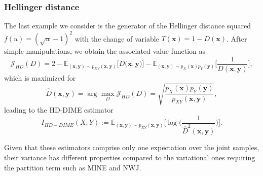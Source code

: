 \subsubsection{Hellinger distance}
The last example we consider is the generator of the Hellinger distance squared $f(u)=(\sqrt{u}-1)^2$ with the change of variable $T(\mathbf{x})=1-D(\mathbf{x})$. After simple manipulations, we obtain the associated value function as
\begin{equation}
\mathcal{J}_{HD}(D) = 2-\mathbb{E}_{(\mathbf{x},\mathbf{y}) \sim p_{XY}(\mathbf{x},\mathbf{y})}\biggl[D\bigl(\mathbf{x},\mathbf{y}\bigr)\biggr] -\mathbb{E}_{(\mathbf{x},\mathbf{y}) \sim p_{X}(\mathbf{x})p_{Y}(\mathbf{y})}\biggl[\frac{1}{D(\mathbf{x},\mathbf{y})}\biggr],
\end{equation}
which is maximized for
\begin{equation}
\label{eq:MI_optimal_ratio_HD}
\hat{D}(\mathbf{x},\mathbf{y}) =\arg \max_D \mathcal{J}_{HD}(D) = \sqrt{\frac{p_X(\mathbf{x})p_Y(\mathbf{y})}{p_{XY}(\mathbf{x},\mathbf{y})}},
\end{equation}
leading to the HD-DIME estimator
\begin{equation}
\label{eq:MI_HD-DIME}
I_{HD-DIME}(X;Y) :=  \mathbb{E}_{(\mathbf{x},\mathbf{y}) \sim p_{XY}(\mathbf{x},\mathbf{y})}\biggl[ \log \biggl(\frac{1}{\hat{D}^2(\mathbf{x},\mathbf{y})}\biggr) \biggr].
\end{equation}

Given that these estimators comprise only one expectation over the joint samples, their variance has different properties compared to the variational ones requiring the partition term such as MINE and NWJ. 


